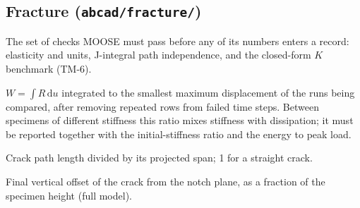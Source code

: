 \documentclass[11pt]{article}
\begin{document}
\subsection{Fracture (\texttt{abcad/fracture/})}
\begin{description}[style=nextline,itemsep=0.35em]
  \item[Validation gate] The set of checks MOOSE must pass before any of its numbers enters a
    record: elasticity and units, J-integral path independence, and the closed-form $K$ benchmark
    (TM-6).
  \item[Work to common displacement] $W = \int R\,\mathrm{d}u$ integrated to the smallest maximum
    displacement of the runs being compared, after removing repeated rows from failed time steps.
    Between specimens of different stiffness this ratio mixes stiffness with dissipation; it must be
    reported together with the initial-stiffness ratio and the energy to peak load.
  \item[Crack tortuosity] Crack path length divided by its projected span; 1 for a straight crack.
  \item[Crack drift] Final vertical offset of the crack from the notch plane, as a fraction of the
    specimen height (full model).
\end{description}
\end{document}
